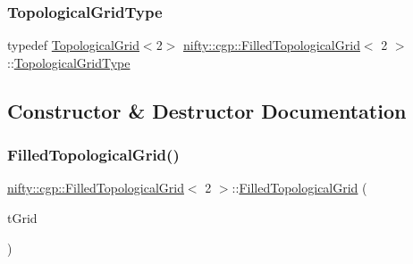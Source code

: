 \mbox{\label{classnifty_1_1cgp_1_1FilledTopologicalGrid_3_012_01_4_a18ed401fbaca132c3a3bce16c8f448a9}} 
\subsubsection{\texorpdfstring{Topological\+Grid\+Type}{TopologicalGridType}}
{\footnotesize\ttfamily typedef \hyperlink{classnifty_1_1cgp_1_1TopologicalGrid}{Topological\+Grid}$<$2$>$ \hyperlink{classnifty_1_1cgp_1_1FilledTopologicalGrid}{nifty\+::cgp\+::\+Filled\+Topological\+Grid}$<$ 2 $>$\+::\hyperlink{classnifty_1_1cgp_1_1FilledTopologicalGrid_3_012_01_4_a18ed401fbaca132c3a3bce16c8f448a9}{Topological\+Grid\+Type}}



\subsection{Constructor \& Destructor Documentation}
\mbox{\label{classnifty_1_1cgp_1_1FilledTopologicalGrid_3_012_01_4_abdd8feabb36e019fb27d2a57c025ae06}} 
\subsubsection{\texorpdfstring{Filled\+Topological\+Grid()}{FilledTopologicalGrid()}}
{\footnotesize\ttfamily \hyperlink{classnifty_1_1cgp_1_1FilledTopologicalGrid}{nifty\+::cgp\+::\+Filled\+Topological\+Grid}$<$ 2 $>$\+::\hyperlink{classnifty_1_1cgp_1_1FilledTopologicalGrid}{Filled\+Topological\+Grid} (\begin{DoxyParamCaption}\item[{const \hyperlink{classnifty_1_1cgp_1_1FilledTopologicalGrid_3_012_01_4_a18ed401fbaca132c3a3bce16c8f448a9}{Topological\+Grid\+Type} \&}]{t\+Grid }\end{DoxyParamCaption})\hspace{0.3cm}{\ttfamily [inline]}}



